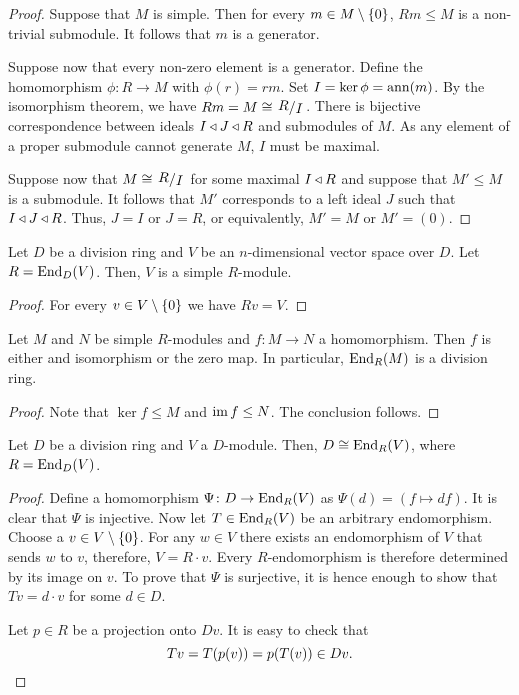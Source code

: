 \begin{proof}
Suppose that $M$ is simple. Then for every
$m \in M \setminus \left\{0\right\}$, $Rm \leq M$ is a non-trivial
submodule. It follows that $m$ is a generator.

Suppose now that every non-zero element is a generator. Define the
homomorphism $\phi \colon R \to M$ with $\phi(r) = rm$. Set
$I = \ker \phi = \operatorname{ann}(m)$. By the isomorphism theorem, we have
$Rm = M \cong \kvoc{R}{I}$. There is bijective correspondence
between ideals $I \triangleleft J \triangleleft R$ and submodules of $M$. As any
element of a proper submodule cannot generate $M$, $I$ must be
maximal.

Suppose now that $M \cong \kvoc{R}{I}$ for some maximal $I \triangleleft R$
and suppose that $M' \leq M$ is a submodule. It follows that $M'$
corresponds to a left ideal $J$ such that $I \triangleleft J \triangleleft R$. Thus,
$J = I$ or $J = R$, or equivalently, $M' = M$ or $M' = (0)$.
\end{proof}

\begin{posledica}
\label{fin_dim_alg:psl:vec_simp}
Let $D$ be a division ring and $V$ be an $n$-dimensional vector
space over $D$. Let $R = \operatorname{End}_D(V)$. Then, $V$ is a simple
$R$-module.
\end{posledica}

\begin{proof}
For every $v \in V \setminus \left\{0\right\}$ we have $Rv = V$.
\end{proof}

\begin{izrek}
Let $M$ and $N$ be simple $R$-modules and $f \colon M \to N$ a
homomorphism. Then $f$ is either and isomorphism or the zero map.
In particular, $\operatorname{End}_R(M)$ is a division ring.
\end{izrek}

\begin{proof}
Note that $\ker f \leq M$ and $\operatorname{im} f \leq N$. The conclusion
follows.
\end{proof}

\begin{trditev}
Let $D$ be a division ring and $V$ a $D$-module. Then,
$D \cong \operatorname{End}_R(V)$, where $R = \operatorname{End}_D(V)$.
\end{trditev}

\begin{proof}
Define a homomorphism $\Psi \colon D \to \operatorname{End}_R(V)$ as
$\Psi(d) = (f \mapsto df)$. It is clear that $\Psi$ is injective.
Now let $T \in \operatorname{End}_R(V)$ be an arbitrary endomorphism. Choose a
$v \in V \setminus \left\{0\right\}$. For any $w \in V$ there exists an
endomorphism of $V$ that sends $w$ to $v$, therefore,
$V = R \cdot v$. Every $R$-endomorphism is therefore determined
by its image on $v$. To prove that $\Psi$ is surjective, it is
hence enough to show that $Tv = d \cdot v$ for some $d \in D$.

Let $p \in R$ be a projection onto $Dv$. It is easy to check that
\[
Tv = T(p(v)) = p(T(v)) \in Dv. \qedhere
\]
\end{proof}


